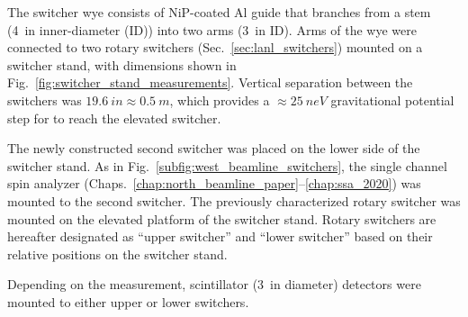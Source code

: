 The switcher wye consists of NiP-coated Al guide that branches from a stem (\qty{4}{in} inner-diameter (ID)) into two arms (\qty{3}{in} ID). Arms of the wye were connected to two rotary switchers (Sec.~\ref{sec:lanl_switchers}) mounted on a switcher stand, with dimensions shown in Fig.~\ref{fig:switcher_stand_measurements}. Vertical separation between the switchers was $\qty{19.6}{in}\approx \qty{0.5}{m}$, which provides a $\approx \qty{25}{neV}$ gravitational potential step for \ucn to reach the elevated switcher.

The newly constructed second switcher was placed on the lower side of the switcher stand. As in Fig.~\ref{subfig:west_beamline_switchers}, the single channel spin analyzer (Chaps.~\ref{chap:north_beamline_paper}--\ref{chap:ssa_2020}) was mounted to the second switcher. The previously characterized rotary switcher was mounted on the elevated platform of the switcher stand. Rotary switchers are hereafter designated as ``upper switcher'' and ``lower switcher'' based on their relative positions on the switcher stand.

Depending on the measurement, \BZnS scintillator (\qty{3}{in} diameter) \ucn detectors were mounted to either upper or lower switchers.


